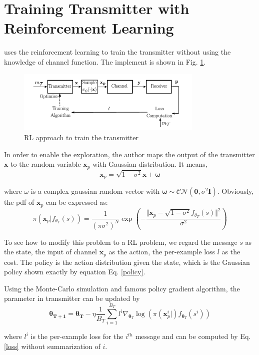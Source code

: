 \documentclass[12pt,a4paper]{article}
\begin{document}
	\section{Training Transmitter with Reinforcement Learning}
	\noindent
	\par \citep{8645416} uses the reinforcement learning to train the transmitter without using the knowledge of channel function. The implement is shown in Fig. \ref{RL}. 
	\begin{figure}[h] \label{RL}
		\centering
		\includegraphics[width=3.5in]{RL.png}
		\caption{RL approach to train the transmitter}
	\end{figure}
	\par In order to enable the exploration, the author maps the output of the transmitter $\bm{x}$ to the random variable $\bm{x}_p$ with Gaussian distribution. It means,
	\begin{equation}
		\bm{x}_p=\sqrt{1-\sigma^2}\bm{x}+\bm{\omega}
	\end{equation}
	\par where $\omega$ is a complex gaussian random vector with $\bm{\omega}\sim\mathcal{CN}(\bm{0},\sigma^2\mathbf{I})$. Obviously, the pdf of $\bm{x}_p$ can be expressed as:
	\begin{equation} \label{policy}
		\pi(\bm{x}_p\vert f_{\theta_T}(s))=\frac{1}{(\pi\sigma^2)^N}\exp(-\frac{\Vert\bm{x}_p-\sqrt{1-\sigma^2}f_{\theta_T}(s)\Vert^2}{\sigma^2})
	\end{equation}
	\par To see how to modify this problem to a RL problem, we regard the message $s$ as the state, the input of channel $\bm{x}_p$ as the action, the per-example loss $l$ as the cost. The policy is the action distribution given the state, which is the Gaussian policy shown exactly by equation Eq. \eqref{policy}.
	\par Using the Monte-Carlo simulation and famous policy gradient algorithm, the parameter in transmitter can be updated by
	\begin{equation}
		\bm{\theta_{T+1}}=\bm{\theta_T}-\eta\frac{1}{B_T}\sum_{i=1}^{B_T}l^{i}\nabla_{\bm{\theta}_T}\log(\pi(\bm{x}_p^{i}\vert)f_{\bm{\theta}_T}(s^{i}))
	\end{equation}
	\par where $l^{i}$ is the per-example loss for the $i^{th}$ message and can be computed by Eq. \eqref{loss} without summarization of $i$.
\end{document}
